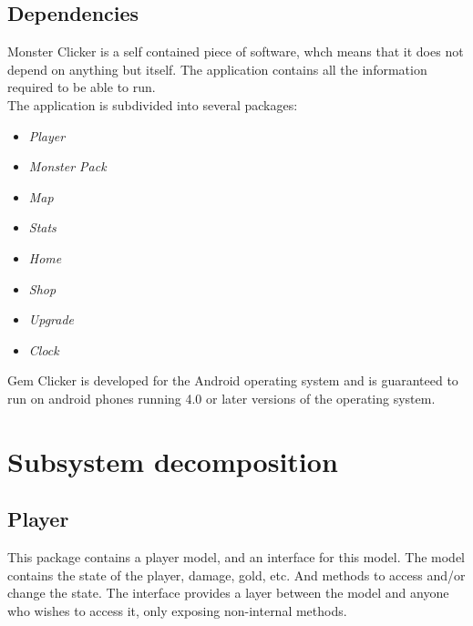 \documentclass{article}
\begin{document}
\subsection{Dependencies}
Monster Clicker is a self contained piece of software, whch means that it does not
depend on anything but itself. The application contains all the information 
required to be able to run. \\

\noindent
The application is subdivided into several packages:
\begin{itemize}
    \item \emph{Player} 
    \item \emph{Monster Pack}
    \item \emph{Map}
    \item \emph{Stats}
    \item \emph{Home}
    \item \emph{Shop}
    \item \emph{Upgrade}
    \item \emph{Clock}
\end{itemize}

\noindent
Gem Clicker is developed for the Android operating system and is guaranteed to
run on android phones running 4.0 or later versions of the operating system.  

\section{Subsystem decomposition}

\subsection{Player}
This package contains a player model, and an interface for this model. The model contains the state of the player, damage, gold, etc. And methods to access and/or change the state. The interface provides a layer between the model and anyone who wishes to access it, only exposing non-internal methods.
\newpage
\end{document}
